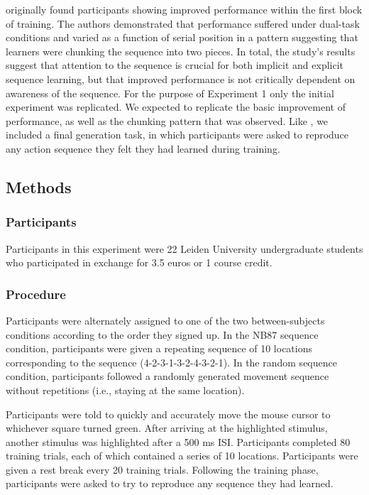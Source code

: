 \documentclass[man,floatsintext]{apa6}
\begin{document}
 originally found participants showing improved performance within the first block of training. The authors demonstrated that performance suffered under dual-task conditions and varied as a function of serial position in a pattern suggesting that learners were chunking the sequence into two pieces. In total, the study's results suggest that attention to the sequence is crucial for both implicit and explicit sequence learning, but that improved performance is not critically dependent on awareness of the sequence. For the purpose of Experiment 1 only the initial experiment was replicated. We expected to replicate the basic improvement of performance, as well as the chunking pattern that was observed. Like , we included a final generation task, in which participants were asked to reproduce any action sequence they felt they had learned during training.

\subsection{Methods}

\subsubsection{Participants}

Participants in this experiment were 22 Leiden University undergraduate students who participated in exchange for 3.5 euros or 1 course credit.

\subsubsection{Procedure}

Participants were alternately assigned to one of the two between-subjects conditions according to the order they signed up. In the NB87 sequence condition, participants were given a repeating sequence of 10 locations corresponding to the  sequence (4-2-3-1-3-2-4-3-2-1). In the random sequence condition, participants followed a randomly generated movement sequence without repetitions (i.e., staying at the same location). 

Participants were told to quickly and accurately move the mouse cursor to whichever square turned green. After arriving at the highlighted stimulus, another stimulus was highlighted after a 500 ms ISI. Participants completed 80 training trials, each of which contained a series of 10 locations. Participants were given a rest break every 20 training trials. Following the training phase, participants were asked to try to reproduce any sequence they had learned.
\end{document}
